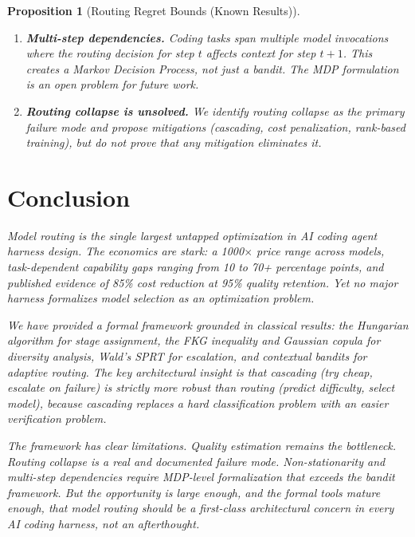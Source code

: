 \documentclass[11pt, a4paper, logo, copyright]{googledeepmind}
\newtheorem{proposition}{Proposition}[section]
\begin{document}
\begin{proposition}[Routing Regret Bounds (Known Results)]
\begin{enumerate}
\item \textbf{Multi-step dependencies.} Coding tasks span multiple model invocations where the routing decision for step $t$ affects context for step $t+1$. This creates a Markov Decision Process, not just a bandit. The MDP formulation is an open problem for future work.

\item \textbf{Routing collapse is unsolved.} We identify routing collapse as the primary failure mode and propose mitigations (cascading, cost penalization, rank-based training), but do not prove that any mitigation eliminates it.
\end{enumerate}


\section{Conclusion}
\label{sec:conclusion}

Model routing is the single largest untapped optimization in AI coding agent harness design. The economics are stark: a 1000$\times$ price range across models, task-dependent capability gaps ranging from 10 to 70+ percentage points, and published evidence of 85\% cost reduction at 95\% quality retention. Yet no major harness formalizes model selection as an optimization problem.

We have provided a formal framework grounded in classical results: the Hungarian algorithm for stage assignment, the FKG inequality and Gaussian copula for diversity analysis, Wald's SPRT for escalation, and contextual bandits for adaptive routing. The key architectural insight is that cascading (try cheap, escalate on failure) is strictly more robust than routing (predict difficulty, select model), because cascading replaces a hard classification problem with an easier verification problem.

The framework has clear limitations. Quality estimation remains the bottleneck. Routing collapse is a real and documented failure mode. Non-stationarity and multi-step dependencies require MDP-level formalization that exceeds the bandit framework. But the opportunity is large enough, and the formal tools mature enough, that model routing should be a first-class architectural concern in every AI coding harness, not an afterthought.






\end{proposition}
\end{document}
